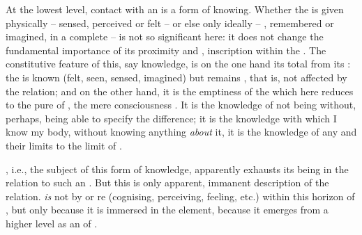 
\imm At the lowest level,  contact with an  is a form of
knowing.  Whether the  is given physically -- sensed, perceived or
felt -- or else only ideally -- , remembered or imagined, in a
complete  -- is not so significant here: it does not change the
fundamental importance of its proximity and , inscription within
the \hoa.  The constitutive feature of this, say  knowledge, is on
the one hand its total  from its : the 
is known (felt, seen, sensed, imagined) but remains , that is, not
affected by the relation; and on the other hand, it is the emptiness of the
 which here reduces to the pure  of
 , the mere consciousness . It is the
knowledge of  not being  without, perhaps, being able to
specify the difference; it is the knowledge with which I know my body, without
knowing anything {\em about} it, it is the knowledge of any 
and their limits  to the limit of .

, i.e., the subject of this form of knowledge, apparently exhausts
its being in the relation to such an . But this is only
apparent, immanent description of the relation.  {\em is} not by
 or re (cognising, perceiving, feeling, etc.) within this
horizon of , but only because it is immersed in the
  element, because it emerges from a higher level as
an  of .
  
